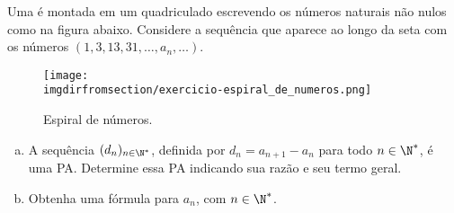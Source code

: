 \begin{exercise}
    Uma  é montada em um quadriculado escrevendo os números naturais não nulos como na figura abaixo. Considere a sequência que aparece ao longo da seta com os números $(1, 3, 13, 31, \dots , a_n, \dots)$.
    \begin{figure}[H]
        \centering
        \label{fig:exercicio-espiral}
        \texttt{[image: \\imgdirfromsection/exercicio-espiral\_de\_numeros.png]}
		\caption{Espiral de números.}
    \end{figure}
\begin{enumerate}[a)]
\item A sequência $(d_n)_{n \in \N^\ast}$, definida por $d_n = a_{n+1} - a_n$ para todo $n \in \N^\ast$, é uma PA. Determine essa PA indicando sua razão e seu termo geral.
\item Obtenha uma fórmula para $a_n$, com $n \in \N^\ast$.
\end{enumerate}
\end{exercise}


